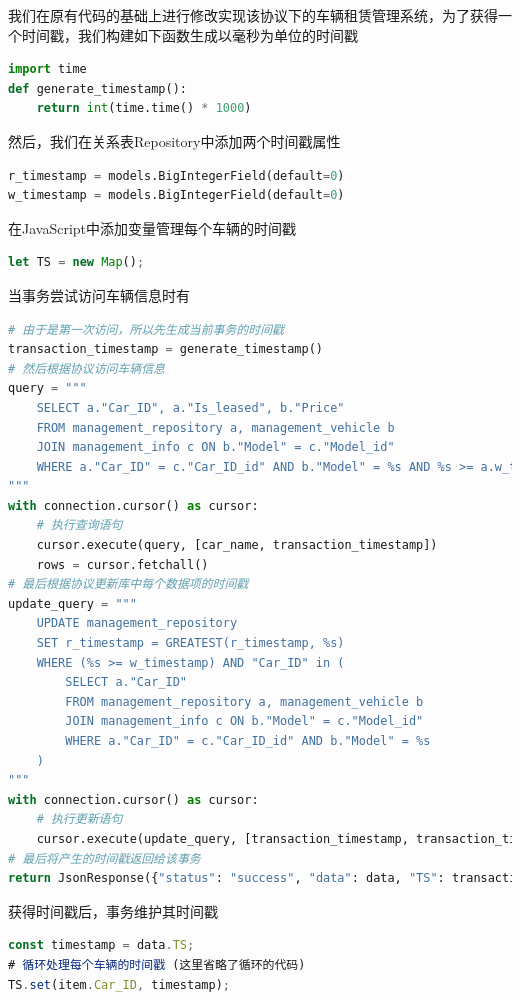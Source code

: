 \documentclass[UTF8,a4paper,12pt]{ctexart}
\begin{document}
我们在原有代码的基础上进行修改实现该协议下的车辆租赁管理系统，为了获得一个时间戳，我们构建如下函数生成以毫秒为单位的时间戳
\begin{lstlisting}[language=Python]
import time
def generate_timestamp():
    return int(time.time() * 1000)
\end{lstlisting}

然后，我们在关系表Repository中添加两个时间戳属性
\begin{lstlisting}[language=Python]
r_timestamp = models.BigIntegerField(default=0)
w_timestamp = models.BigIntegerField(default=0)
\end{lstlisting}

在JavaScript中添加变量管理每个车辆的时间戳
\begin{lstlisting}[language=JavaScript]
let TS = new Map();
\end{lstlisting}

当事务尝试访问车辆信息时有
\begin{lstlisting}[language=Python]
# 由于是第一次访问，所以先生成当前事务的时间戳
transaction_timestamp = generate_timestamp()
# 然后根据协议访问车辆信息
query = """
    SELECT a."Car_ID", a."Is_leased", b."Price"
    FROM management_repository a, management_vehicle b
    JOIN management_info c ON b."Model" = c."Model_id"
    WHERE a."Car_ID" = c."Car_ID_id" AND b."Model" = %s AND %s >= a.w_timestamp
"""
with connection.cursor() as cursor:
    # 执行查询语句
    cursor.execute(query, [car_name, transaction_timestamp])
    rows = cursor.fetchall()
# 最后根据协议更新库中每个数据项的时间戳
update_query = """
    UPDATE management_repository
    SET r_timestamp = GREATEST(r_timestamp, %s)
    WHERE (%s >= w_timestamp) AND "Car_ID" in (
        SELECT a."Car_ID"
        FROM management_repository a, management_vehicle b
        JOIN management_info c ON b."Model" = c."Model_id"
        WHERE a."Car_ID" = c."Car_ID_id" AND b."Model" = %s
    )
"""
with connection.cursor() as cursor:
    # 执行更新语句
    cursor.execute(update_query, [transaction_timestamp, transaction_timestamp, car_name])
# 最后将产生的时间戳返回给该事务
return JsonResponse({"status": "success", "data": data, "TS": transaction_timestamp})
\end{lstlisting}

获得时间戳后，事务维护其时间戳
\begin{lstlisting}[language=JavaScript]
const timestamp = data.TS;
# 循环处理每个车辆的时间戳 (这里省略了循环的代码)
TS.set(item.Car_ID, timestamp);
\end{lstlisting}
\end{document}
